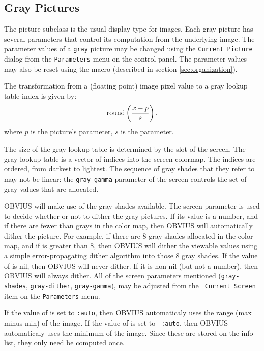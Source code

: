 \subsection{Gray Pictures}
\label{sec:gray}

The  picture subclass is the usual display type for images.
Each gray picture has several parameters that control its computation
from the underlying image.  The parameter values of a {\tt gray}
picture may be changed using the {\tt Current Picture} dialog from the
{\tt Parameters} menu on the control panel.  The parameter values may
also be reset using the  macro (described in section
\ref{sec:organization}).

The transformation from a (floating point) image pixel value to a gray
lookup table index is given by:
\begin{displaymath}
{\rm round}\left( \frac{x - p}{s} \right),
\end{displaymath}
where $p$ is the picture's  parameter, $s$ is the
 parameter.

The size of the gray lookup table is determined by the
 slot of the screen.  The gray lookup table is a
vector of indices into the screen colormap.  The indices are ordered,
from darkest to lightest.  The sequence of gray shades that they refer
to may not be linear: the {\tt gray-gamma} parameter of the screen
controls the set of gray values that are allocated.

OBVIUS will make use of the gray shades available.  The screen
parameter  is used to decide whether or not to
dither the gray pictures.  If its value is a number, and if there are
fewer than  grays in the color map, then OBVIUS will
automatically dither the picture.  For example, if there are 8 gray
shades allocated in the color map, and if  is
greater than 8, then OBVIUS will dither the viewable values using a
simple error-propagating dither algorithm into those 8 gray shades.
If the value of  is nil, then OBVIUS will never
dither.  If it is non-nil (but not a number), then OBVIUS will always
dither.  All of the screen parameters mentioned ({\tt gray-shades},
{\tt gray-dither}, {\tt gray-gamma}), may be adjusted from the {\tt
Current Screen} item on the {\tt Parameters} menu.

If the value of  is set to {\tt :auto},
then OBVIUS automaticaly uses the range (max minus min) of the image.
If the value of  is set to {\tt
:auto}, then OBVIUS automaticaly uses the
minimum of the image.  Since these are stored on the info list, they
only need be computed once.

